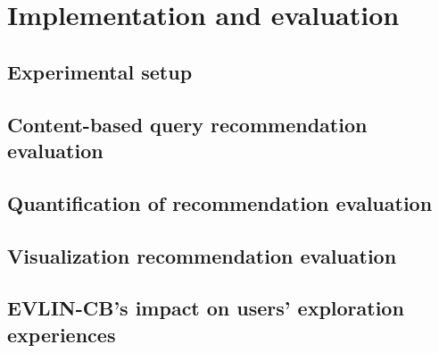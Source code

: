  \section{Implementation and evaluation}
  \label{sec:evaluation-part1}
 	 		  	 
			 \subsection{Experimental setup}
			   	 
               		\subsection{Content-based query recommendation evaluation}
			   	 
		         \subsection{Quantification of recommendation evaluation}
		           	 
			 \subsection{Visualization recommendation evaluation}
			   	 
		          \subsection{EVLIN-CB's impact on users' exploration experiences}
		           	 


